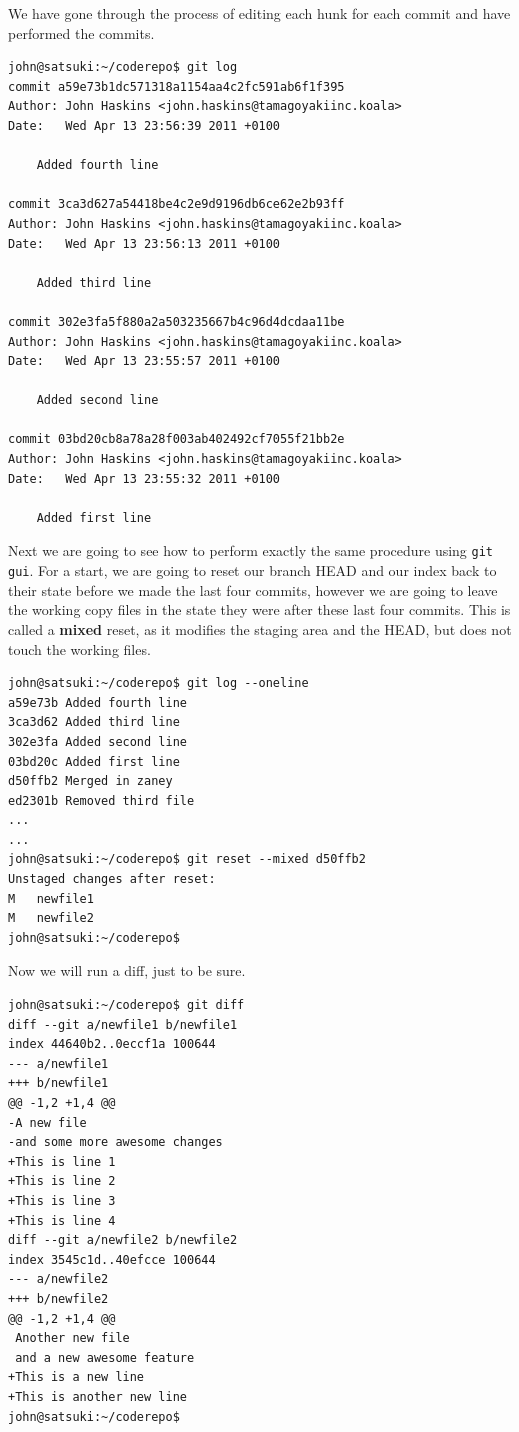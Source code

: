 We have gone through the process of editing each hunk for each commit and have performed the commits.

\begin{Verbatim}
john@satsuki:~/coderepo$ git log
commit a59e73b1dc571318a1154aa4c2fc591ab6f1f395
Author: John Haskins <john.haskins@tamagoyakiinc.koala>
Date:   Wed Apr 13 23:56:39 2011 +0100

    Added fourth line

commit 3ca3d627a54418be4c2e9d9196db6ce62e2b93ff
Author: John Haskins <john.haskins@tamagoyakiinc.koala>
Date:   Wed Apr 13 23:56:13 2011 +0100

    Added third line

commit 302e3fa5f880a2a503235667b4c96d4dcdaa11be
Author: John Haskins <john.haskins@tamagoyakiinc.koala>
Date:   Wed Apr 13 23:55:57 2011 +0100

    Added second line

commit 03bd20cb8a78a28f003ab402492cf7055f21bb2e
Author: John Haskins <john.haskins@tamagoyakiinc.koala>
Date:   Wed Apr 13 23:55:32 2011 +0100

    Added first line
\end{Verbatim}

Next we are going to see how to perform exactly the same procedure using \texttt{git gui}.
For a start, we are going to reset our branch HEAD and our index back to their state before we made the last four commits, however we are going to leave the working copy files in the state they were after these last four commits.
This is called a \textbf{mixed} reset, as it modifies the staging area and the HEAD, but does not touch the working files.

\begin{Verbatim}
john@satsuki:~/coderepo$ git log --oneline
a59e73b Added fourth line
3ca3d62 Added third line
302e3fa Added second line
03bd20c Added first line
d50ffb2 Merged in zaney
ed2301b Removed third file
...
...
john@satsuki:~/coderepo$ git reset --mixed d50ffb2
Unstaged changes after reset:
M	newfile1
M	newfile2
john@satsuki:~/coderepo$
\end{Verbatim}

Now we will run a diff, just to be sure.

\begin{Verbatim}
john@satsuki:~/coderepo$ git diff
diff --git a/newfile1 b/newfile1
index 44640b2..0eccf1a 100644
--- a/newfile1
+++ b/newfile1
@@ -1,2 +1,4 @@
-A new file
-and some more awesome changes
+This is line 1
+This is line 2
+This is line 3
+This is line 4
diff --git a/newfile2 b/newfile2
index 3545c1d..40efcce 100644
--- a/newfile2
+++ b/newfile2
@@ -1,2 +1,4 @@
 Another new file
 and a new awesome feature
+This is a new line
+This is another new line
john@satsuki:~/coderepo$
\end{Verbatim}

